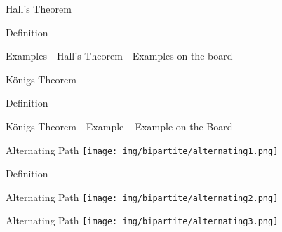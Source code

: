\begin{frame}{Hall's Theorem}
\begin{block}{Definition}
\end{block} 
\end{frame}

\begin{frame}{Examples - Hall's Theorem}
- Examples on the board --

\end{frame}
  
\begin{frame}{Königs Theorem}
\begin{block}{Definition}
\end{block} 
\end{frame}

\begin{frame}{Königs Theorem - Example}
-- Example on the Board -- 
  
\end{frame}

\begin{frame}{Alternating Path}
\centering
\texttt{[image: img/bipartite/alternating1.png]}
\begin{block}{Definition}
\end{block} 
\end{frame}

\begin{frame}{Alternating Path}
\texttt{[image: img/bipartite/alternating2.png]}
  
\end{frame}

\begin{frame}{Alternating Path}
\texttt{[image: img/bipartite/alternating3.png]}
  
\end{frame}

